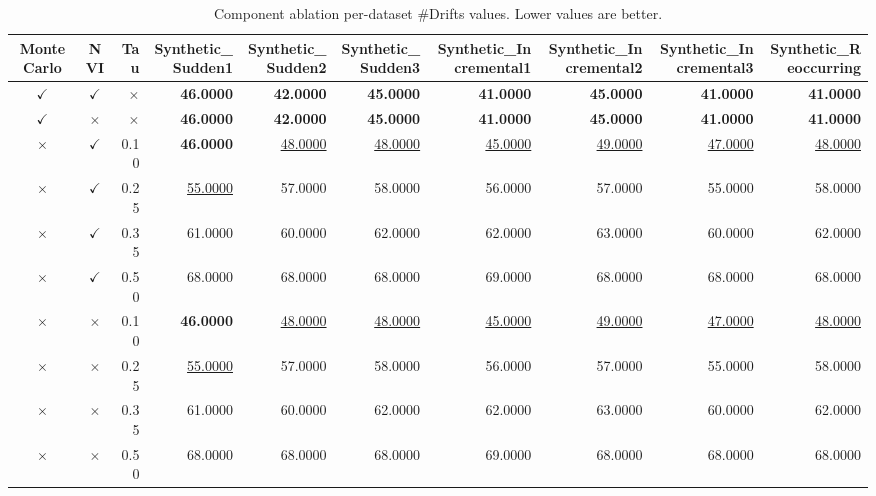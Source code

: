 \begin{table}
\caption{Component ablation per-dataset \#Drifts values. Lower values are better.}
\label{tab:per-data-component-ablation-n-drifts-detected}
\begin{tabular}{ccrrrrrrrr}
\toprule
Monte Carlo & NVI & Tau & Synthetic\_Sudden1 & Synthetic\_Sudden2 & Synthetic\_Sudden3 & Synthetic\_Incremental1 & Synthetic\_Incremental2 & Synthetic\_Incremental3 & Synthetic\_Reoccurring \\
\midrule
$\checkmark$ & $\checkmark$ & $\times$ & \textbf{46.0000} & \textbf{42.0000} & \textbf{45.0000} & \textbf{41.0000} & \textbf{45.0000} & \textbf{41.0000} & \textbf{41.0000} \\
$\checkmark$ & $\times$ & $\times$ & \textbf{46.0000} & \textbf{42.0000} & \textbf{45.0000} & \textbf{41.0000} & \textbf{45.0000} & \textbf{41.0000} & \textbf{41.0000} \\
$\times$ & $\checkmark$ & 0.10 & \textbf{46.0000} & \underline{48.0000} & \underline{48.0000} & \underline{45.0000} & \underline{49.0000} & \underline{47.0000} & \underline{48.0000} \\
$\times$ & $\checkmark$ & 0.25 & \underline{55.0000} & 57.0000 & 58.0000 & 56.0000 & 57.0000 & 55.0000 & 58.0000 \\
$\times$ & $\checkmark$ & 0.35 & 61.0000 & 60.0000 & 62.0000 & 62.0000 & 63.0000 & 60.0000 & 62.0000 \\
$\times$ & $\checkmark$ & 0.50 & 68.0000 & 68.0000 & 68.0000 & 69.0000 & 68.0000 & 68.0000 & 68.0000 \\
$\times$ & $\times$ & 0.10 & \textbf{46.0000} & \underline{48.0000} & \underline{48.0000} & \underline{45.0000} & \underline{49.0000} & \underline{47.0000} & \underline{48.0000} \\
$\times$ & $\times$ & 0.25 & \underline{55.0000} & 57.0000 & 58.0000 & 56.0000 & 57.0000 & 55.0000 & 58.0000 \\
$\times$ & $\times$ & 0.35 & 61.0000 & 60.0000 & 62.0000 & 62.0000 & 63.0000 & 60.0000 & 62.0000 \\
$\times$ & $\times$ & 0.50 & 68.0000 & 68.0000 & 68.0000 & 69.0000 & 68.0000 & 68.0000 & 68.0000 \\
\bottomrule
\end{tabular}
\end{table}

